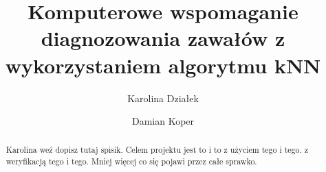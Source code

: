 \documentclass[runningheads]{llncs2e/llncs}
\begin{document}
\title{Komputerowe wspomaganie diagnozowania zawałów z wykorzystaniem algorytmu kNN}

%
%
\author{Karolina Działek \and
    Damian Koper
}
%
%
%
\maketitle              %
%
\begin{abstract}
    Karolina weź dopisz tutaj spisik. Celem projektu jest to i to z użyciem tego i tego. z weryfikacją tego i tego. Mniej więcej co się pojawi przez całe sprawko.

\end{abstract}
%



\clearpage
%
%
%


%
\end{document}
